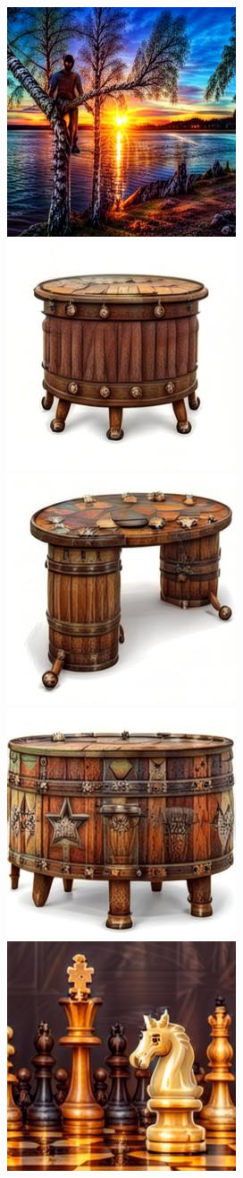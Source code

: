 \begin{figure}[h!]
\begin{subfigure}[t]{0.32\linewidth}
	\includegraphics[width=0.320\linewidth]{figs/samples_appendix_3/draft1k_cfg_2_ode_prompt_69_image_3.jpg}\\ 
	\includegraphics[width=0.320\linewidth]{figs/samples_appendix_3/draft1k_cfg_2_ode_prompt_73_image_1.jpg}\;%
	\includegraphics[width=0.320\linewidth]{figs/samples_appendix_3/draft1k_cfg_2_ode_prompt_73_image_2.jpg}\;%
	\includegraphics[width=0.320\linewidth]{figs/samples_appendix_3/draft1k_cfg_2_ode_prompt_73_image_3.jpg}\\ 
	\includegraphics[width=0.320\linewidth]{figs/samples_appendix_3/draft1k_cfg_2_ode_prompt_75_image_1.jpg}\;%

\end{subfigure}
\end{figure}

